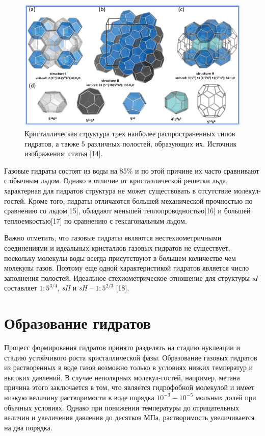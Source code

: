 \begin{figure}[H]
    \centering
    \includegraphics[width=.9\linewidth]{figures/hydrstruct.png}
    \caption{Кристаллическая структура трех наиболее распространенных типов гидратов, а также 5 различных полостей, образующих их. Источник изображения: статья [14].}
    \label{fig1.2.1}
\end{figure}

\par Газовые гидраты состоят из воды на 85\% и по этой причине их часто сравнивают с обычным льдом. Однако в отличие от кристаллической решетки льда, характерная для гидратов структура не может существовать в отсутствие молекул-гостей. Кроме того, гидраты отличаются большей механической прочностью по сравнению со льдом[15], обладают меньшей теплопроводностью[16] и большей теплоемкостью[17] по сравнению с гексагональным льдом.

\par Важно отметить, что газовые гидраты являются нестехиометричными соединениями и идеальных кристаллов газовых гидратов не существует, поскольку молекулы воды всегда присутствуют в большем  количестве чем молекулы газов. Поэтому еще одной характеристикой гидратов является число заполнения полостей. Идеальное стехиометрическое отношение для структуры \textit{sI} составляет $1:5^{3/4}$, \textit{sII} и \textit{sH} -- $1:5^{2/3}$ [18].

\pagebreak
\section{Образование гидратов}
\par Процесс формирования гидратов принято разделять на стадию нуклеации и стадию устойчивого роста кристаллической фазы. Образование газовых гидратов из растворенных в воде газов возможно только в условиях низких температур и высоких давлений. В случае неполярных молекул-гостей, например, метана причина этого заключается в том, что  является гидрофобной молекулой и имеет низкую величину растворимости в воде порядка $10^{-3}-10^{-5}$ мольных долей при обычных условиях. Однако при понижении температуры до отрицательных величин и увеличения давления до десятков МПа, растворимость   увеличивается на два порядка.

